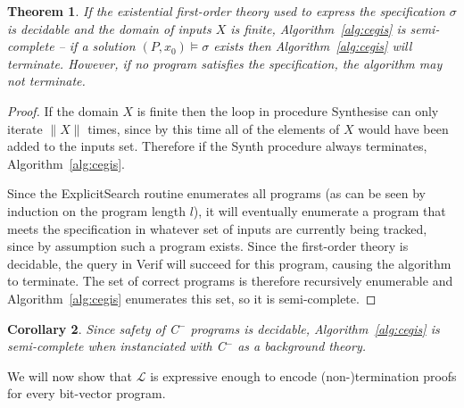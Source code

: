 \documentclass[preprint]{sigplanconf}
\newtheorem{theorem}{Theorem}
\newtheorem{corollary}[theorem]{Corollary}
\theoremstyle{definition}
\newcommand{\newC}{C$^-$\xspace}
\begin{document}
\begin{theorem}
 \label{thm:synth-semicomplete}
 If the existential first-order theory used to express the specification $\sigma$ is decidable
 and the domain of inputs $X$ is finite,
 Algorithm~\ref{alg:cegis} is semi-complete -- if a solution $(P, x_0) \models \sigma$
 exists then Algorithm~\ref{alg:cegis} will terminate.  However, if no program
 satisfies the specification, the algorithm may not terminate.
\end{theorem}

\begin{proof}
 If the domain $X$ is finite then the loop in procedure {\sc Synthesise} can only
 iterate $\| X \|$ times, since by this time all of the elements of $X$ would have been
 added to the inputs set.  Therefore if the {\sc Synth} procedure always terminates,
 Algorithm~\ref{alg:cegis}.

 Since the {\sc ExplicitSearch} routine enumerates all programs (as can be seen by induction on
 the program length $l$), it will eventually enumerate a program that meets the specification
 in whatever set of inputs are currently being tracked, since by assumption such a program
 exists.  Since the first-order theory is
 decidable, the query in {\sc Verif} will succeed for this program, causing the algorithm to terminate.
 The set of correct programs is therefore recursively enumerable and Algorithm~\ref{alg:cegis}
 enumerates this set, so it is semi-complete.
\end{proof}

\begin{corollary}
\label{cor:cegis-newc}
 Since safety of \newC programs is decidable, Algorithm~\ref{alg:cegis} is semi-complete
 when instanciated with \newC as a background theory.
\end{corollary}


% 

We will now show that $\mathcal{L}$ is expressive enough to encode (non-)termination proofs for
every bit-vector program.
\end{document}
